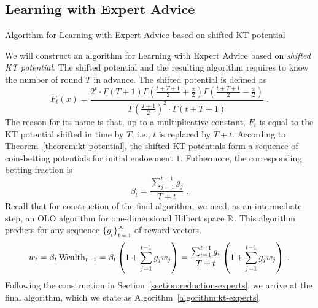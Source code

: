 \subsection{Learning with Expert Advice}

\begin{algorithm}
\begin{algorithmic}
\caption{Algorithm for Learning with Expert Advice based on shifted KT potential
\label{algorithm:kt-experts}}
{
\ENDFOR
}
\end{algorithmic}
\end{algorithm}

We will construct an algorithm for Learning with Expert Advice based on
\emph{shifted KT potential}. The shifted potential and the resulting algorithm
requires to know the number of round $T$ in advance. The shifted potential is
defined as
$$
F_t(x) = \frac{2^t \cdot \Gamma(T + 1) \Gamma(\frac{t+T+1}{2} + \frac{x}{2}) \Gamma(\frac{t+T+1}{2} - \frac{x}{2})}{\Gamma(\frac{T+1}{2})^2 \cdot \Gamma(t+T+1)} \; .
$$
The reason for its name is that, up to a multiplicative constant, $F_t$ is equal
to the KT potential shifted in time by $T$, i.e., $t$ is replaced by $T+t$.
According to Theorem~\ref{theorem:kt-potential}, the shifted KT potentials form
a sequence of coin-betting potentials for initial endowment $1$. Futhermore, the
corresponding betting fraction is
$$
\beta_t = \frac{\sum_{j=1}^{t-1} g_j}{T+t} \; .
$$
Recall that for construction of the final algorithm, we need, as an intermediate
step, an OLO algorithm for one-dimensional Hilbert space $\mathbb{R}$. This algorithm
predicts for any sequence $\{g_t\}_{t=1}^\infty$ of reward vectors.
$$
w_t
= \beta_t \operatorname{Wealth}_{t-1}
= \beta_t \left(1 + \sum_{j=1}^{t-1} g_j w_j \right)
= \frac{\sum_{i=1}^{t-1} g_i}{T+t} \left(1 + \sum_{j=1}^{t-1} g_j w_j \right) \; .
$$
Following the construction in Section~\ref{section:reduction-experts}, we arrive
at the final algorithm, which we state as Algorithm~\ref{algorithm:kt-experts}.

